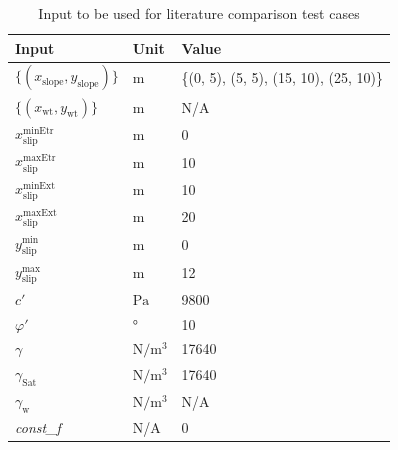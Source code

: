 \documentclass[12pt, titlepage]{article}
\begin{document}
\begin{table}[h!]
\renewcommand{\arraystretch}{1.5}
\begin{tabularx}{1.0\textwidth}{p{7cm} l X}
	\toprule \textbf{Input} &
	\textbf{Unit} & \textbf{Value}\\ \midrule
	$\{\left(x_\text{slope},y_\text{slope}\right)\}$ & $\text{m}$ & \{(0, 5), 
	(5, 5), (15, 10), (25, 10)\}\\
	$\{\left(x_\text{wt},y_\text{wt}\right)\}$ & $\text{m}$ & N/A\\
	${x_\text{slip}^\text{minEtr}}$ & $\text{m}$ & 0\\
	${x_\text{slip}^\text{maxEtr}}$ & $\text{m}$ & 10\\
	${x_\text{slip}^\text{minExt}}$ & $\text{m}$ & 10\\
	${x_\text{slip}^\text{maxExt}}$ & $\text{m}$ & 20\\
	${y_\text{slip}^\text{min}}$ & $\text{m}$ & 0\\
	${y_\text{slip}^\text{max}}$ & $\text{m}$ & 12\\
	$c'$ & $\si{\pascal}$ & 9800 \\
	$\varphi'$ & \si{\degree} & 10\\
	$\gamma$ & $\si{\newton\per\meter\cubed}$ & 17640 \\
	$\gamma_{\text{Sat}}$ & $\si{\newton\per\meter\cubed}$ & 17640 \\
	$\gamma_{\text{w}}$ & $\si{\newton\per\meter\cubed}$ & N/A \\
	\textit{const\_f} & N/A & 0\\ 
	\bottomrule
\end{tabularx}
\caption{Input to be used for literature comparison test cases}
\label{Ex1Input}
\end{table}
\end{document}
